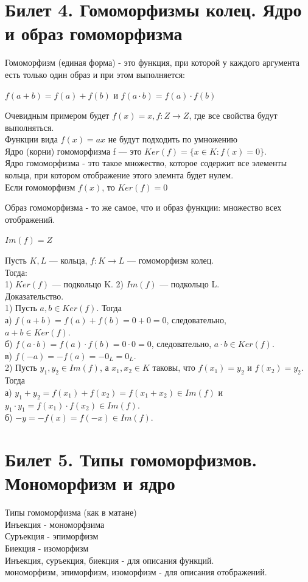 \documentclass[a4paper, 12pt]{article}
\begin{document}
\section{Билет 4. Гомоморфизмы колец. Ядро и образ гомоморфизма}
Гомоморфизм (единая форма) - это функция, при которой у каждого аргумента есть только один образ и при этом выполняется:\\

\begin{center}
	$f(a + b) = f(a) + f(b)$ и $f(a \cdot b) = f(a) \cdot f(b)$
\end{center}

Очевидным примером будет $f(x) = x, f: Z \rightarrow Z $, где все свойства будут выполняться. \\
Функции вида $f(x) = ax$ не будут подходить по умножению\\

Ядро (корни) гомоморфизма f — это $Ker(f ) = \{ x \in K : f(x) = 0 \}$.\\
Ядро гомоморфизма - это такое множество, которое содержит все элементы кольца, при котором отображение этого элемнта будет нулем.\\

Если гомоморфизм $f(x)$, то $Ker(f) = {0}$

Образ гомоморфизма - то же самое, что и образ функции: множество всех отображений.

$Im(f) = Z$

Пусть $K, L$ — кольца, $f : K \rightarrow L$ — гомоморфизм колец.\\
Тогда:\\
1) $Ker(f )$ — подкольцо K.
2) $Im(f )$ — подкольцо L.\\
Доказательство.\\
1) Пусть $a, b \in Ker(f)$. Тогда\\
а) $f (a + b) = f (a) + f (b) = 0 + 0 = 0$, следовательно,\\
$a + b \in Ker(f )$.
\\
б) $f (a \cdot b) = f(a) \cdot f(b) = 0 \cdot 0 = 0$, следовательно,
$a \cdot b \in Ker(f )$.
\\
в) $f (-a) = -f (a) = -0_{L} = 0_{L}$.\\

2) Пусть $y_{1}, y_{2} \in Im(f)$, а $x_{1}, x_{2} \in K$ таковы, что $f(x_{1}) = y_2$ и $f(x_2) = y_2$.
Тогда \\
а) $y_1 + y_2 = f(x_1) + f(x_2) = f (x_1 + x_2) \in Im(f)$ и $y_1 \cdot y_1 = f(x_1) \cdot f(x_2) \in Im(f).$
\\
б) $-y = -f(x) = f (-x) \in Im(f)$.

\section{Билет 5. Типы гомоморфизмов. Мономорфизм и ядро}

Типы гомоморфизма (как в матане)
\\
Инъекция - мономорфзима\\
Суръекция - эпиморфизм\\
Биекция - изоморфизм\\

Инъекция, суръекция, биекция - для описания функций.\\
мономорфизм, эпиморфизм, изоморфизм - для описания отображений.
\end{document}
